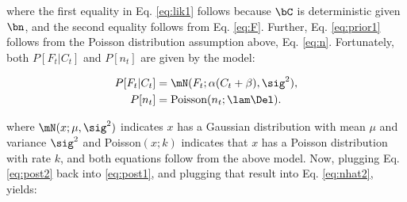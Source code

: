 \noindent where the first equality in Eq. \eqref{eq:lik1} follows because $\bC$ is deterministic given $\bn$, and the second equality follows from Eq. \eqref{eq:F}. Further, Eq. \eqref{eq:prior1} follows from the Poisson distribution assumption above, Eq. \eqref{eq:n}.  Fortunately, both $P[F_t | C_t]$ and $P[n_t]$ are given by the model:

\begin{subequations} \label{eq:post2}
\begin{align}
P[F_t | C_t] &= \mN(F_t; \alpha(C_t+\beta),\sig^2), \label{eq:lik2} \\
P[n_t] &= \text{Poisson}(n_t; \lam \Del). \label{eq:prior2} 
\end{align}
\end{subequations}

\noindent where $\mN(x;\mu,\sig^2)$ indicates $x$ has a Gaussian distribution with mean $\mu$ and variance $\sig^2$ and Poisson$(x;k)$ indicates that $x$ has a Poisson distribution with rate $k$, and both equations follow from the above model.  
% 
% 
% 
Now, plugging Eq. \eqref{eq:post2} back into \eqref{eq:post1}, and plugging that result into Eq. \eqref{eq:nhat2}, yields:

